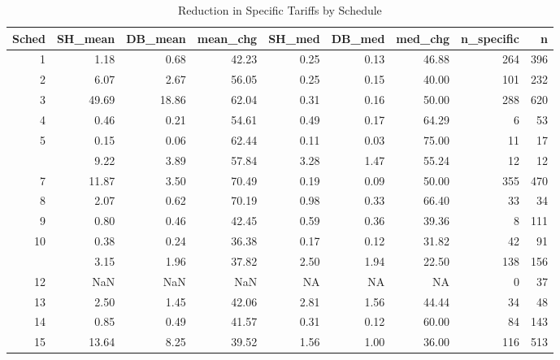 \documentclass[
  12pt,
]{article}
\begin{document}
\begin{table}[!h]

\caption{\label{tab:sp-sc}Reduction in Specific Tariffs by Schedule}
\centering
\begin{tabular}[t]{rrrrrrrrr}
\toprule
Sched & SH\_mean & DB\_mean & mean\_chg & SH\_med & DB\_med & med\_chg & n\_specific & n\\
\midrule
1 & 1.18 & 0.68 & 42.23 & 0.25 & 0.13 & 46.88 & 264 & 396\\
2 & 6.07 & 2.67 & 56.05 & 0.25 & 0.15 & 40.00 & 101 & 232\\
3 & 49.69 & 18.86 & 62.04 & 0.31 & 0.16 & 50.00 & 288 & 620\\
4 & 0.46 & 0.21 & 54.61 & 0.49 & 0.17 & 64.29 & 6 & 53\\
5 & 0.15 & 0.06 & 62.44 & 0.11 & 0.03 & 75.00 & 11 & 17\\
\addlinespace
6 & 9.22 & 3.89 & 57.84 & 3.28 & 1.47 & 55.24 & 12 & 12\\
7 & 11.87 & 3.50 & 70.49 & 0.19 & 0.09 & 50.00 & 355 & 470\\
8 & 2.07 & 0.62 & 70.19 & 0.98 & 0.33 & 66.40 & 33 & 34\\
9 & 0.80 & 0.46 & 42.45 & 0.59 & 0.36 & 39.36 & 8 & 111\\
10 & 0.38 & 0.24 & 36.38 & 0.17 & 0.12 & 31.82 & 42 & 91\\
\addlinespace
11 & 3.15 & 1.96 & 37.82 & 2.50 & 1.94 & 22.50 & 138 & 156\\
12 & NaN & NaN & NaN & NA & NA & NA & 0 & 37\\
13 & 2.50 & 1.45 & 42.06 & 2.81 & 1.56 & 44.44 & 34 & 48\\
14 & 0.85 & 0.49 & 41.57 & 0.31 & 0.12 & 60.00 & 84 & 143\\
15 & 13.64 & 8.25 & 39.52 & 1.56 & 1.00 & 36.00 & 116 & 513\\
\bottomrule
\end{tabular}
\end{table}
\end{document}
